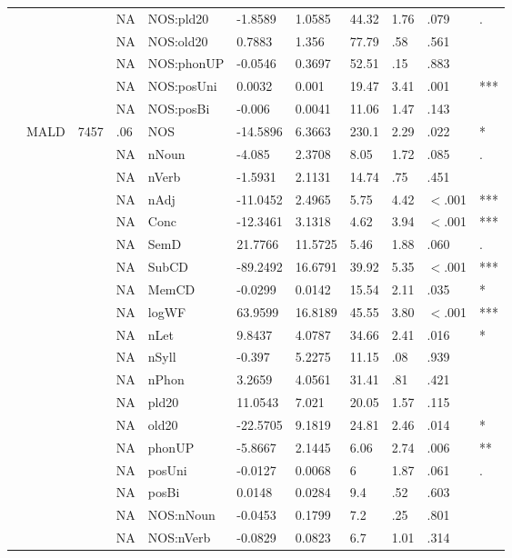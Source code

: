 \begin{table}[ht]
\begin{tabular}{lllllllllll}
   &  &  & NA & NOS:pld20 & -1.8589 & 1.0585 & 44.32 & 1.76 & .079 & . \\ 
   &  &  & NA & NOS:old20 & 0.7883 & 1.356 & 77.79 & .58 & .561 &   \\ 
   &  &  & NA & NOS:phonUP & -0.0546 & 0.3697 & 52.51 & .15 & .883 &   \\ 
   &  &  & NA & NOS:posUni & 0.0032 & 0.001 & 19.47 & 3.41 & .001 & *** \\ 
   &  &  & NA & NOS:posBi & -0.006 & 0.0041 & 11.06 & 1.47 & .143 &   \\ 
   & MALD & 7457 & .06 & NOS & -14.5896 & 6.3663 & 230.1 & 2.29 & .022 & * \\ 
   &  &  & NA & nNoun & -4.085 & 2.3708 & 8.05 & 1.72 & .085 & . \\ 
   &  &  & NA & nVerb & -1.5931 & 2.1131 & 14.74 & .75 & .451 &   \\ 
   &  &  & NA & nAdj & -11.0452 & 2.4965 & 5.75 & 4.42 & $<$.001 & *** \\ 
   &  &  & NA & Conc & -12.3461 & 3.1318 & 4.62 & 3.94 & $<$.001 & *** \\ 
   &  &  & NA & SemD & 21.7766 & 11.5725 & 5.46 & 1.88 & .060 & . \\ 
   &  &  & NA & SubCD & -89.2492 & 16.6791 & 39.92 & 5.35 & $<$.001 & *** \\ 
   &  &  & NA & MemCD & -0.0299 & 0.0142 & 15.54 & 2.11 & .035 & * \\ 
   &  &  & NA & logWF & 63.9599 & 16.8189 & 45.55 & 3.80 & $<$.001 & *** \\ 
   &  &  & NA & nLet & 9.8437 & 4.0787 & 34.66 & 2.41 & .016 & * \\ 
   &  &  & NA & nSyll & -0.397 & 5.2275 & 11.15 & .08 & .939 &   \\ 
   &  &  & NA & nPhon & 3.2659 & 4.0561 & 31.41 & .81 & .421 &   \\ 
   &  &  & NA & pld20 & 11.0543 & 7.021 & 20.05 & 1.57 & .115 &   \\ 
   &  &  & NA & old20 & -22.5705 & 9.1819 & 24.81 & 2.46 & .014 & * \\ 
   &  &  & NA & phonUP & -5.8667 & 2.1445 & 6.06 & 2.74 & .006 & ** \\ 
   &  &  & NA & posUni & -0.0127 & 0.0068 & 6 & 1.87 & .061 & . \\ 
   &  &  & NA & posBi & 0.0148 & 0.0284 & 9.4 & .52 & .603 &   \\ 
   &  &  & NA & NOS:nNoun & -0.0453 & 0.1799 & 7.2 & .25 & .801 &   \\ 
   &  &  & NA & NOS:nVerb & -0.0829 & 0.0823 & 6.7 & 1.01 & .314 &   \\ 

\end{tabular}
\end{table}
